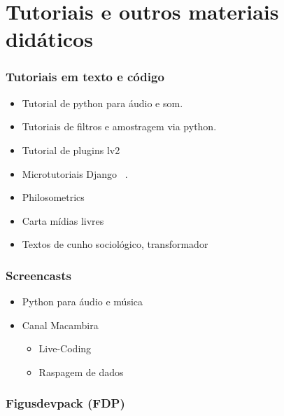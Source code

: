 \chapter{Tutoriais e outros materiais didáticos} %
\label{cap:tutsDidads}

\subsection{Tutoriais em texto e código}
\begin{itemize}
    \item Tutorial de python para áudio e som.

    \item Tutoriais de filtros e amostragem via python.

    \item Tutorial de plugins lv2

    \item Microtutoriais Django ~\cite{dmicrotuts}.

    \item Philosometrics

    \item Carta mídias livres

    \item Textos de cunho sociológico, transformador

\end{itemize}

\subsection{Screencasts}

\begin{itemize}
    \item Python para áudio e música

    \item Canal Macambira

    \begin{itemize}
	\item Live-Coding
	\item Raspagem de dados
    \end{itemize}
\end{itemize}



\subsection{Figusdevpack (FDP)}